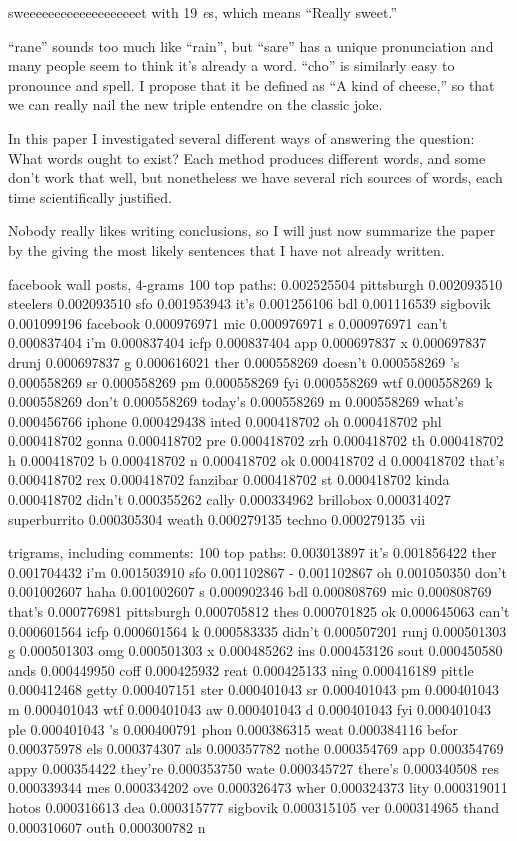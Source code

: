 \documentclass[twocolumn]{article}
\begin{document}
sweeeeeeeeeeeeeeeeeeet with 19 {\it e}s, which means ``Really sweet.''

``rane'' sounds too much like ``rain'', but ``sare'' has a unique pronunciation and many people seem to think it's already a word. ``cho'' is similarly easy to pronounce and spell. I propose that it be defined as ``A kind of cheese,'' so that we can really nail the new triple entendre on the classic joke.

In this paper I investigated several different ways of answering the
question: What words ought to exist? Each method produces different
words, and some don't work that well, but nonetheless we have several
rich sources of words, each time scientifically justified.

Nobody really likes writing conclusions, so I will just now summarize
the paper by the giving the most likely sentences that I have not
already written.


facebook wall posts, 4-grams
100 top paths:
0.002525504 pittsburgh
0.002093510 steelers
0.002093510 sfo
0.001953943 it's
0.001256106 bdl
0.001116539 sigbovik
0.001099196 facebook
0.000976971 mic
0.000976971 s
0.000976971 can't
0.000837404 i'm
0.000837404 icfp
0.000837404 app
0.000697837 x
0.000697837 drunj
0.000697837 g
0.000616021 ther
0.000558269 doesn't
0.000558269 's
0.000558269 sr
0.000558269 pm
0.000558269 fyi
0.000558269 wtf
0.000558269 k
0.000558269 don't
0.000558269 today's
0.000558269 m
0.000558269 what's
0.000456766 iphone
0.000429438 inted
0.000418702 oh
0.000418702 phl
0.000418702 gonna
0.000418702 pre
0.000418702 zrh
0.000418702 th
0.000418702 h
0.000418702 b
0.000418702 n
0.000418702 ok
0.000418702 d
0.000418702 that's
0.000418702 rex
0.000418702 fanzibar
0.000418702 st
0.000418702 kinda
0.000418702 didn't
0.000355262 cally
0.000334962 brillobox
0.000314027 superburrito
0.000305304 weath
0.000279135 techno
0.000279135 vii


trigrams, including comments:
100 top paths:
0.003013897 it's
0.001856422 ther
0.001704432 i'm
0.001503910 sfo
0.001102867 -
0.001102867 oh
0.001050350 don't
0.001002607 haha
0.001002607 s
0.000902346 bdl
0.000808769 mic
0.000808769 that's
0.000776981 pittsburgh
0.000705812 thes
0.000701825 ok
0.000645063 can't
0.000601564 icfp
0.000601564 k
0.000583335 didn't
0.000507201 runj
0.000501303 g
0.000501303 omg
0.000501303 x
0.000485262 ins
0.000453126 sout
0.000450580 ands
0.000449950 coff
0.000425932 reat
0.000425133 ning
0.000416189 pittle
0.000412468 getty
0.000407151 ster
0.000401043 sr
0.000401043 pm
0.000401043 m
0.000401043 wtf
0.000401043 aw
0.000401043 d
0.000401043 fyi
0.000401043 ple
0.000401043 's
0.000400791 phon
0.000386315 weat
0.000384116 befor
0.000375978 els
0.000374307 als
0.000357782 nothe
0.000354769 app
0.000354769 appy
0.000354422 they're
0.000353750 wate
0.000345727 there's
0.000340508 res
0.000339344 mes
0.000334202 ove
0.000326473 wher
0.000324373 lity
0.000319011 hotos
0.000316613 dea
0.000315777 sigbovik
0.000315105 ver
0.000314965 thand
0.000310607 outh
0.000300782 n
\end{document}
